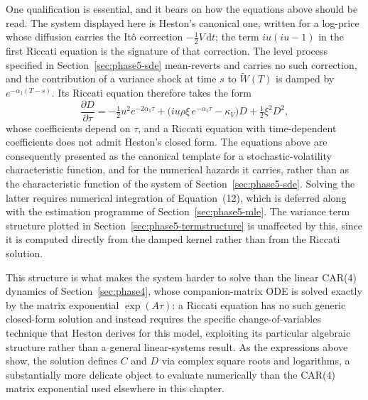One qualification is essential, and it bears on how the equations above should be read. The system displayed here is Heston's canonical one, written for a log-price whose diffusion carries the It\^o correction $-\tfrac12 V\,\mathrm dt$; the term $iu(iu-1)$ in the first Riccati equation is the signature of that correction. The level process specified in Section~\ref{sec:phase5-sde} mean-reverts and carries no such correction, and the contribution of a variance shock at time $s$ to $\widetilde W(T)$ is damped by $e^{-\alpha_1(T-s)}$. Its Riccati equation therefore takes the form
\begin{equation}
\frac{\partial D}{\partial\tau} = -\tfrac12 u^2 e^{-2\alpha_1\tau} + \bigl(iu\rho\xi\, e^{-\alpha_1\tau} - \kappa_V\bigr)D + \tfrac12 \xi^2 D^2,
\end{equation}
whose coefficients depend on $\tau$, and a Riccati equation with time-dependent coefficients does not admit Heston's closed form. The equations above are consequently presented as the canonical template for a stochastic-volatility characteristic function, and for the numerical hazards it carries, rather than as the characteristic function of the system of Section~\ref{sec:phase5-sde}. Solving the latter requires numerical integration of Equation~(12), which is deferred along with the estimation programme of Section~\ref{sec:phase5-mle}. The variance term structure plotted in Section~\ref{sec:phase5-termstructure} is unaffected by this, since it is computed directly from the damped kernel rather than from the Riccati solution.

This structure is what makes the system harder to solve than the linear CAR(4) dynamics of Section~\ref{sec:phase4}, whose companion-matrix ODE is solved exactly by the matrix exponential $\exp(A\tau)$: a Riccati equation has no such generic closed-form solution and instead requires the specific change-of-variables technique that Heston \citeyearpar{Heston1993} derives for this model, exploiting its particular algebraic structure rather than a general linear-systems result. As the expressions above show, the solution defines $C$ and $D$ via complex square roots and logarithms, a substantially more delicate object to evaluate numerically than the CAR(4) matrix exponential used elsewhere in this chapter.

